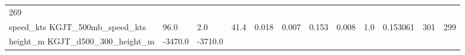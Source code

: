 \documentclass[11pt]{article}
\begin{document}
\begin{longtable}[]{@{}llllllllllll@{}}
\begin{minipage}[t]{0.07\columnwidth}
269\strut
\end{minipage}\tabularnewline
\begin{minipage}[t]{0.18\columnwidth}\raggedright\strut
speed\_kts KGJT\_500mb\_speed\_kts\strut
\end{minipage} & \begin{minipage}[t]{0.04\columnwidth}\raggedright\strut
96.0\strut
\end{minipage} & \begin{minipage}[t]{0.04\columnwidth}\raggedright\strut
2.0\strut
\end{minipage} & \begin{minipage}[t]{0.04\columnwidth}\raggedright\strut
41.4\strut
\end{minipage} & \begin{minipage}[t]{0.04\columnwidth}\raggedright\strut
0.018\strut
\end{minipage} & \begin{minipage}[t]{0.05\columnwidth}\raggedright\strut
0.007\strut
\end{minipage} & \begin{minipage}[t]{0.04\columnwidth}\raggedright\strut
0.153\strut
\end{minipage} & \begin{minipage}[t]{0.04\columnwidth}\raggedright\strut
0.008\strut
\end{minipage} & \begin{minipage}[t]{0.05\columnwidth}\raggedright\strut
1.0\strut
\end{minipage} & \begin{minipage}[t]{0.05\columnwidth}\raggedright\strut
0.153061\strut
\end{minipage} & \begin{minipage}[t]{0.05\columnwidth}\raggedright\strut
301\strut
\end{minipage} & \begin{minipage}[t]{0.07\columnwidth}\raggedright\strut
299\strut
\end{minipage}\tabularnewline
\begin{minipage}[t]{0.18\columnwidth}\raggedright\strut
height\_m KGJT\_d500\_300\_height\_m\strut
\end{minipage} & \begin{minipage}[t]{0.04\columnwidth}\raggedright\strut
-3470.0\strut
\end{minipage} & \begin{minipage}[t]{0.04\columnwidth}\raggedright\strut
-3710.0\strut
\end{minipage} & \begin{minipage}[t]{0.04\columnwidth}\raggedright\strut

\end{minipage}
\end{longtable}
\end{document}
